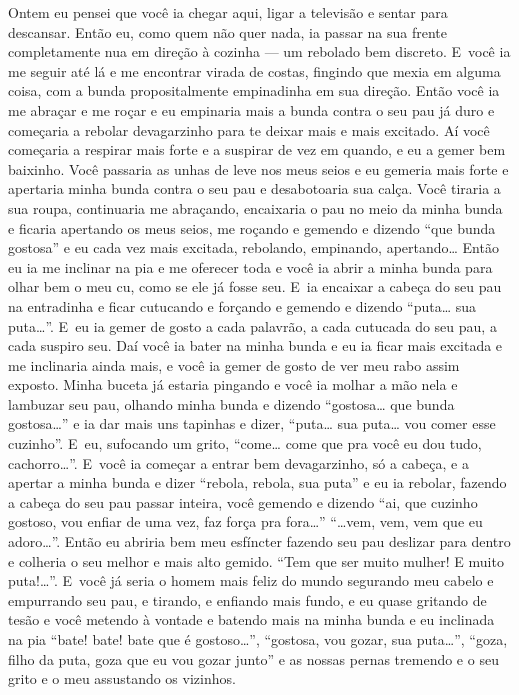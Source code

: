 Ontem eu pensei que você ia chegar aqui, ligar a televisão e sentar para
descansar. Então eu, como quem não quer nada, ia passar na sua frente
completamente nua em direção à cozinha --- um rebolado bem discreto. E~você ia me seguir até lá e me encontrar virada de costas, fingindo que
mexia em alguma coisa, com a bunda propositalmente empinadinha em sua
direção. Então você ia me abraçar e me roçar e eu empinaria mais a bunda
contra o seu pau já duro e começaria a rebolar devagarzinho para te
deixar mais e mais excitado. Aí você começaria a respirar mais forte e a
suspirar de vez em quando, e eu a gemer bem baixinho. Você passaria as
unhas de leve nos meus seios e eu gemeria mais forte e apertaria minha
bunda contra o seu pau e desabotoaria sua calça. Você tiraria a sua
roupa, continuaria me abraçando, encaixaria o pau no meio da minha bunda
e ficaria apertando os meus seios, me roçando e gemendo e dizendo ``que
bunda gostosa'' e eu cada vez mais excitada, rebolando, empinando,
apertando… Então eu ia me inclinar na pia e me oferecer toda e
você ia abrir a minha bunda para olhar bem o meu cu, como se ele já
fosse seu. E~ia encaixar a cabeça do seu pau na entradinha e ficar
cutucando e forçando e gemendo e dizendo ``puta… sua
puta…''. E~eu ia gemer de gosto a cada palavrão, a cada cutucada
do seu pau, a cada suspiro seu. Daí você ia bater na minha bunda e eu ia
ficar mais excitada e me inclinaria ainda mais, e você ia gemer de gosto
de ver meu rabo assim exposto. Minha buceta já estaria pingando e você
ia molhar a mão nela e lambuzar seu pau, olhando minha bunda e dizendo
``gostosa… que bunda gostosa…'' e ia dar mais uns tapinhas
e dizer, ``puta… sua puta… vou comer esse cuzinho''. E~eu,
sufocando um grito, ``come… come que pra você eu dou tudo,
cachorro…''. E~você ia começar a entrar bem devagarzinho, só a
cabeça, e a apertar a minha bunda e dizer ``rebola, rebola, sua puta'' e
eu ia rebolar, fazendo a cabeça do seu pau passar inteira, você gemendo
e dizendo ``ai, que cuzinho gostoso, vou enfiar de uma vez, faz força
pra fora…'' ``…vem, vem, vem que eu adoro…''. Então
eu abriria bem meu esfíncter fazendo seu pau deslizar para dentro e
colheria o seu melhor e mais alto gemido. ``Tem que ser muito mulher! E
muito puta!…''. E~você já seria o homem mais feliz do mundo
segurando meu cabelo e empurrando seu pau, e tirando, e enfiando mais
fundo, e eu quase gritando de tesão e você metendo à vontade e batendo
mais na minha bunda e eu inclinada na pia ``bate! bate! bate que é
gostoso…'', ``gostosa, vou gozar, sua puta…'', ``goza, filho
da puta, goza que eu vou gozar junto'' e as nossas pernas tremendo e o
seu grito e o meu assustando os vizinhos.

